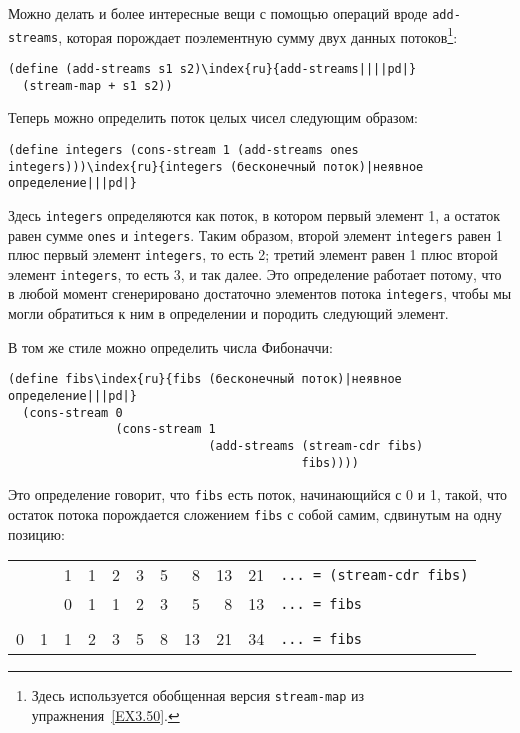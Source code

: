 Можно делать и более интересные вещи с помощью операций
вроде {\tt add-streams}, которая порождает поэлементную сумму
двух данных потоков\footnote{Здесь используется обобщенная версия
{\tt stream-map} из упражнения~\ref{EX3.50}.
}:

\begin{Verbatim}[fontsize=\small]
(define (add-streams s1 s2)\index{ru}{add-streams||||pd|}
  (stream-map + s1 s2))
\end{Verbatim}
Теперь можно определить поток целых чисел следующим образом:

\begin{Verbatim}[fontsize=\small]
(define integers (cons-stream 1 (add-streams ones integers)))\index{ru}{integers (бесконечный поток)|неявное определение|||pd|}
\end{Verbatim}
Здесь {\tt integers} определяются как поток, в котором первый
элемент 1, а остаток равен сумме {\tt ones} и
{\tt integers}. Таким образом, второй элемент
{\tt integers} равен 1 плюс первый элемент
{\tt integers}, то есть 2; третий элемент равен 1 плюс второй
элемент {\tt integers}, то есть 3, и так далее.  Это
определение работает потому, что в любой момент сгенерировано
достаточно элементов потока {\tt integers}, чтобы мы могли
обратиться к ним в определении и породить следующий элемент.

В том же стиле можно определить числа Фибоначчи:

\begin{Verbatim}[fontsize=\small]
(define fibs\index{ru}{fibs (бесконечный поток)|неявное определение|||pd|}
  (cons-stream 0
               (cons-stream 1
                            (add-streams (stream-cdr fibs)
                                         fibs))))
\end{Verbatim}
Это определение говорит, что {\tt fibs} есть поток, начинающийся
с 0 и 1, такой, что остаток потока порождается сложением
{\tt fibs} с собой самим, сдвинутым на одну позицию:

\medskip

\begin{tabular}{rrrrrrrrrrl}
   &   & 1 & 1 & 2 & 3 & 5 &  8 & 13 & 21 & \texttt{... = (stream-cdr fibs)}\\
   &   & 0 & 1 & 1 & 2 & 3 &  5 &  8 & 13 & \texttt{... = fibs}\\
\hline\\
 0 & 1 & 1 & 2 & 3 & 5 & 8 & 13 & 21 & 34 & \texttt{... = fibs}\\
\end{tabular}
\medskip%

